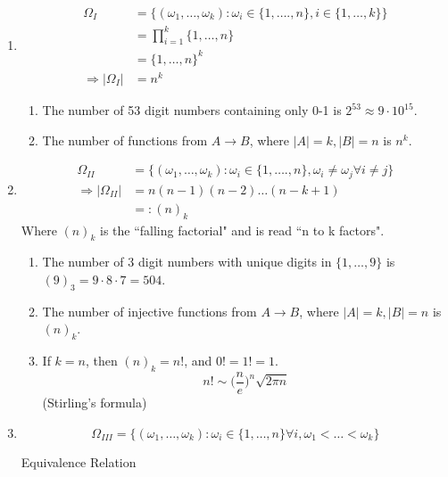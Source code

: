 \documentclass{article}
\begin{document}
	\begin{enumerate}[label=(\Roman*)]
		\item
		\begin{align*}
			\Omega_I&=\{(\omega_1, \dots, \omega_k) : \omega_i\in\{1, \dots., n\}, i\in\{1, \dots, k\}\}\\
			&=\prod_{i=1}^k\{1, \dots, n\}\\
			&=\{1, \dots, n\}^k\\
			\Rightarrow|\Omega_I|&=n^k
		\end{align*}
		\begin{myex*}{}{}
			\begin{enumerate}
				\item The number of 53 digit numbers containing only 0-1 is $2^{53}\approx9\cdot10^{15}$.
				\item The number of functions from $A\to B$, where $|A|=k, |B|=n$ is $n^k$.
			\end{enumerate}
		\end{myex*}
		\item
		\begin{align*}
			\Omega_{II}&=\{(\omega_1, \dots, \omega_k) : \omega_i\in\{1, \dots., n\}, \omega_i\neq\omega_j\forall i\neq j\}\\
			\Rightarrow|\Omega_{II}|&=n(n-1)(n-2)\dots(n-k+1)\\
			&=:(n)_k
		\end{align*}
		Where $(n)_k$ is the ``falling factorial" and is read ``n to k factors".
		\begin{myex*}{}{}
			\begin{enumerate}
				\item The number of 3 digit numbers with unique digits in $\{1, \dots, 9\}$ is $(9)_3=9\cdot8\cdot7=504$.
				\item The number of injective functions from $A\to B$, where $|A|=k, |B|=n$ is $(n)_k$.
				\item If $k=n$, then $(n)_k=n!$, and $0!=1!=1$.\\
				$$n!\sim\big(\frac{n}{e}\big)^n\sqrt{2\pi n}$$ (Stirling's formula)
			\end{enumerate}
		\end{myex*}
		\item
		\begin{equation*}
			\Omega_{III}=\{(\omega_1, \dots, \omega_k) : \omega_i\in\{1, \dots, n\}\forall i, \omega_1<\dots<\omega_k\}
		\end{equation*}
		\begin{mydef*}{Equivalence Relation}{}

\end{mydef*}
\end{enumerate}
\end{document}
